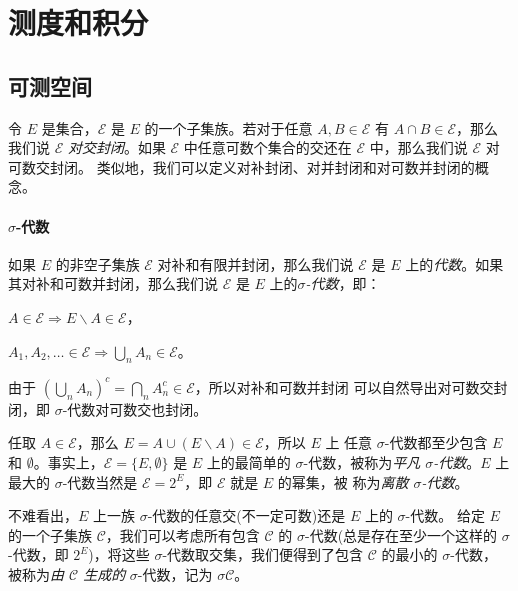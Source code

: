 \documentclass[fontset=none]{Notes}
\begin{document}
\frontmatter

\tableofcontents

\mainmatter

\chapter{测度和积分}

\section{可测空间}

令 $E$ 是集合，$\mathcal{E}$ 是 $E$ 的一个子集族。若对于任意 $A,B\in\mathcal{E}$ 有
$A\cap B\in\mathcal{E}$，那么我们说 $\mathcal{E}$ \emph{对交封闭}。如果 $\mathcal{E}$
中任意可数个集合的交还在 $\mathcal{E}$ 中，那么我们说 $\mathcal{E}$ 对可数交封闭。
类似地，我们可以定义对补封闭、对并封闭和对可数并封闭的概念。

\subsubsection{$\sigma$-代数}

如果 $E$ 的非空子集族 $\mathcal{E}$ 对补和有限并封闭，那么我们说 $\mathcal{E}$
是 $E$ 上的\emph{代数}。如果其对补和可数并封闭，那么我们说 $\mathcal{E}$
是 $E$ 上的\emph{$\sigma$-代数}，即：
\begin{alphenum}
  \item $A\in\mathcal{E}\Rightarrow E\smallsetminus A\in\mathcal{E}$，
  \item $A_1,A_2,\dotsc\in \mathcal{E}\Rightarrow\bigcup_n A_n\in\mathcal{E}$。
\end{alphenum}
由于 $\left(\bigcup_n A_n\right)^c=\bigcap_n A_n^c\in\mathcal{E}$，所以对补和可数并封闭
可以自然导出对可数交封闭，即 $\sigma$-代数对可数交也封闭。

任取 $A\in \mathcal{E}$，那么 $E=A\cup(E \smallsetminus A)\in \mathcal{E}$，所以 $E$ 上
任意 $\sigma$-代数都至少包含 $E$ 和 $\emptyset$。事实上，$\mathcal{E}=\{E,\emptyset\}$
是 $E$ 上的最简单的 $\sigma$-代数，被称为\emph{平凡 $\sigma$-代数}。$E$ 上最大的
$\sigma$-代数当然是 $\mathcal{E}=2^E$，即 $\mathcal{E}$ 就是 $E$ 的幂集，被
称为\emph{离散 $\sigma$-代数}。

不难看出，$E$ 上一族 $\sigma$-代数的任意交(不一定可数)还是 $E$ 上的 $\sigma$-代数。
给定 $E$ 的一个子集族 $\mathcal{C}$，我们可以考虑所有包含 $\mathcal{C}$ 
的 $\sigma$-代数(总是存在至少一个这样的 $\sigma$-代数，即 $2^E$)，将这些
$\sigma$-代数取交集，我们便得到了包含 $\mathcal{C}$ 的最小的 $\sigma$-代数，
被称为\emph{由 $\mathcal{C}$ 生成的} $\sigma$-代数，记为 $\sigma\mathcal{C}$。
\end{document}
